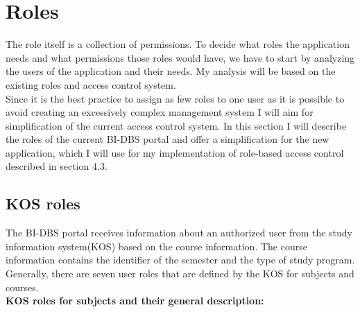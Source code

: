 \section{Roles} The role itself is a collection of permissions. To decide what roles the application needs and what permissions those roles would have, we have to start by analyzing the users of the application and their needs. My analysis will be based on the existing roles and access control system.\\
Since it is the best practice to assign as few roles to one user as it is possible \cite{role-auth} to avoid creating an excessively complex management system I will aim for simplification of the current access control system. In this section I will describe the roles of the current BI-DBS portal and offer a simplification for the new application, which I will use for my implementation of role-based access control described in section 4.3.

\subsection{KOS roles}
The BI-DBS portal receives information about an authorized user from the study information system(KOS) based on the course information. The course information contains the identifier of the semester and the type of study program. Generally, there are seven user roles that are defined by the KOS for subjects and courses.\cite{kosapi}\\

\noindent \textbf{KOS roles for subjects and their general description:\cite{usermapapi}}

